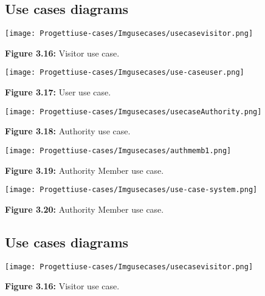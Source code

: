 \documentclass[12pt]{article}
\begin{document}
\newpage

\subsection{Use cases diagrams}

\vspace{5mm}
\begin{center}
\texttt{[image: Progettiuse-cases/Imgusecases/usecasevisitor.png]}                 

\textbf{Figure 3.16:} Visitor use case. 
\end{center}

\begin{center}
\texttt{[image: Progettiuse-cases/Imgusecases/use-caseuser.png]}                 

\textbf{Figure 3.17:} User use case. 
\end{center}

\newpage
\vspace{5mm}
\begin{center}
\texttt{[image: Progettiuse-cases/Imgusecases/usecaseAuthority.png]}                 

\textbf{Figure 3.18:} Authority use case. 
\end{center}

\begin{center}
\texttt{[image: Progettiuse-cases/Imgusecases/authmemb1.png]}                 

\textbf{Figure 3.19:} Authority Member use case. 
\end{center}

\begin{center}
\texttt{[image: Progettiuse-cases/Imgusecases/use-case-system.png]}                  

\textbf{Figure 3.20:} Authority Member use case. 
\end{center}

\newpage


\subsection{Use cases diagrams}

\vspace{5mm}
\begin{center}
\texttt{[image: Progettiuse-cases/Imgusecases/usecasevisitor.png]}                 

\textbf{Figure 3.16:} Visitor use case. 
\end{center}
\end{document}
